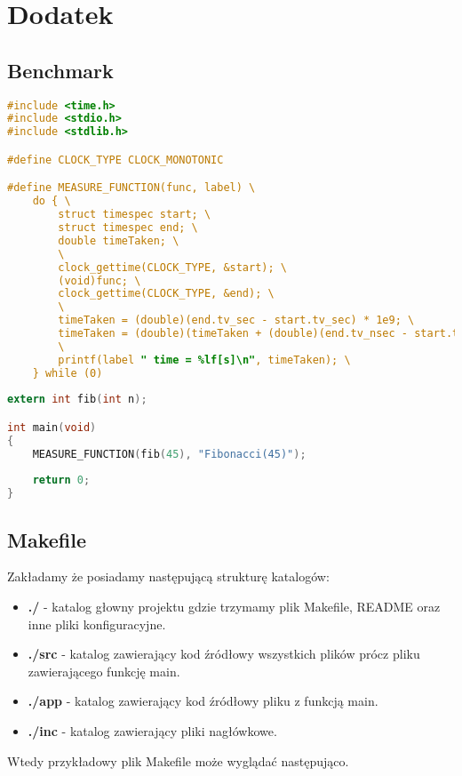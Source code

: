 \section{Dodatek}

\subsection{Benchmark} \label{dodatek:benchmark}
\begin{lstlisting}[language=C,style=C99]
#include <time.h>
#include <stdio.h>
#include <stdlib.h>

#define CLOCK_TYPE CLOCK_MONOTONIC

#define MEASURE_FUNCTION(func, label) \
    do { \
        struct timespec start; \
        struct timespec end; \
        double timeTaken; \
        \
        clock_gettime(CLOCK_TYPE, &start); \
        (void)func; \
        clock_gettime(CLOCK_TYPE, &end); \
        \
        timeTaken = (double)(end.tv_sec - start.tv_sec) * 1e9; \
        timeTaken = (double)(timeTaken + (double)(end.tv_nsec - start.tv_nsec)) * 1e-9; \
        \
        printf(label " time = %lf[s]\n", timeTaken); \
    } while (0)
    
extern int fib(int n);

int main(void)
{
    MEASURE_FUNCTION(fib(45), "Fibonacci(45)");
    
    return 0;
}
\end{lstlisting}

\subsection{Makefile} \label{dodatek:makefile}
Zakładamy że posiadamy następującą strukturę katalogów:
\begin{itemize}
    \item \textbf{./} - katalog głowny projektu gdzie trzymamy plik Makefile, README oraz inne pliki konfiguracyjne.
    \item \textbf{./src} - katalog zawierający kod źródłowy wszystkich plików prócz pliku zawierającego funkcję main.
    \item \textbf{./app} - katalog zawierający kod źródłowy pliku z funkcją main.
    \item \textbf{./inc} - katalog zawierający pliki nagłówkowe.
\end{itemize}

\clearpage
Wtedy przykładowy plik Makefile może wyglądać następująco.

